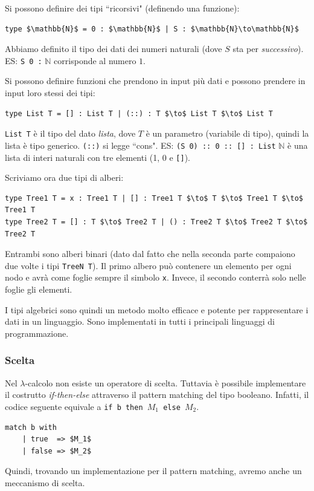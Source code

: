 \documentclass{article}
\begin{document}
\bigskip

\noindent Si possono definire dei tipi ``ricorsivi" (definendo una funzione):
\begin{lstlisting}[mathescape=true]
type $\mathbb{N}$ = 0 : $\mathbb{N}$ | S : $\mathbb{N}\to\mathbb{N}$
\end{lstlisting}
Abbiamo definito il tipo dei dati dei numeri naturali (dove $S$ sta per \textit{successivo}). ES: \verb|S 0 :| $\mathbb{N}$ corrisponde al numero $1$.

\bigskip

Si possono definire funzioni che prendono in input più dati e possono prendere in input loro stessi dei tipi:
\begin{lstlisting}[mathescape=true]
type List T = [] : List T | (::) : T $\to$ List T $\to$ List T
\end{lstlisting}
\verb|List T| è il tipo del dato \textit{lista}, dove $T$ è un parametro (variabile di tipo), quindi la lista è tipo generico. \verb|(::)| si legge ``cons". ES: \verb|(S 0) :: 0 :: [] : List| $\mathbb{N}$ è una lista di interi naturali con tre elementi (1, 0 e \verb|[]|).


\bigskip

Scriviamo ora due tipi di alberi:
\begin{lstlisting}[mathescape=true]
type Tree1 T = x : Tree1 T | [] : Tree1 T $\to$ T $\to$ Tree1 T $\to$ Tree1 T
type Tree2 T = [] : T $\to$ Tree2 T | () : Tree2 T $\to$ Tree2 T $\to$ Tree2 T
\end{lstlisting}
Entrambi sono alberi binari (dato dal fatto che nella seconda parte compaiono due volte i tipi \verb|TreeN T|). Il primo albero può contenere un elemento per ogni nodo e avrà come foglie sempre il simbolo \verb|x|. Invece, il secondo conterrà solo nelle foglie gli elementi.

\bigskip

I tipi algebrici sono quindi un metodo molto efficace e potente per rappresentare i dati in un linguaggio. Sono implementati in tutti i principali linguaggi di programmazione.


\subsubsection{Scelta}
Nel $\lambda$-calcolo non esiste un operatore di scelta. Tuttavia è possibile implementare il costrutto \textit{if-then-else} attraverso il pattern matching del tipo booleano. Infatti, il codice seguente equivale a \verb|if b then |$M_1$\verb| else |$M_2$.
\begin{lstlisting}[mathescape=true]
match b with
    | true  => $M_1$
    | false => $M_2$
\end{lstlisting}
Quindi, trovando un implementazione per il pattern matching, avremo anche un meccanismo di scelta.
\end{document}
